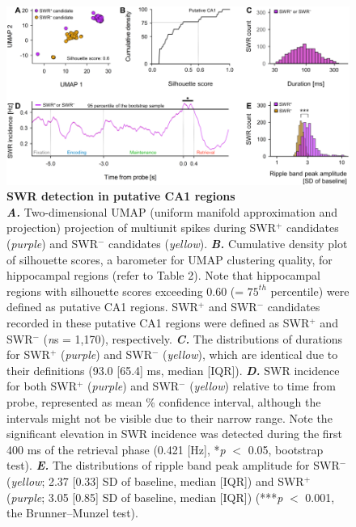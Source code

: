 \documentclass[final,3p,times,twocolumn]{elsarticle}
\begin{document}
        \begin{figure}[ht]
        	\centering
            \includegraphics[width=1\textwidth]{./src/figures/.png/Figure_ID_04.png}
        	\caption{\textbf{
SWR detection in putative CA1 regions
}
\smallskip
\\
\textbf{\textit{A.}} Two-dimensional UMAP (uniform manifold approximation and projection)\cite{mcinnes_umap_2018} projection of multiunit spikes during SWR$^+$ candidates (\textit{purple}) and SWR$^-$ candidates (\textit{yellow}). \textbf{\textit{B.}}  Cumulative density plot of silhouette scores, a barometer for UMAP clustering quality, for hippocampal regions (refer to Table 2). Note that hippocampal regions with silhouette scores exceeding 0.60 (= $75^{th}$ percentile) were defined as putative CA1 regions. SWR$^+$ and SWR$^-$ candidates recorded in these putative CA1 regions were defined as SWR$^+$ and SWR$^-$ (\textit{n}s = 1,170), respectively. \textbf{\textit{C.}}  The distributions of durations for SWR$^+$ (\textit{purple}) and SWR$^-$ (\textit{yellow}), which are identical due to their definitions (93.0 [65.4] ms, median [IQR]). \textbf{\textit{D.}}  SWR incidence for both SWR$^+$ (\textit{purple}) and SWR$^-$ (\textit{yellow}) relative to time from probe, represented as mean \% confidence interval, although the intervals might not be visible due to their narrow range. Note the significant elevation in SWR incidence was detected during the first 400 ms of the retrieval phase (0.421 [Hz], *\textit{p} $<$ 0.05, bootstrap test). \textbf{\textit{E.}}  The distributions of ripple band peak amplitude for SWR$^-$ (\textit{yellow}; 2.37 [0.33] SD of baseline, median [IQR]) and SWR$^+$ (\textit{purple}; 3.05 [0.85] SD of baseline, median [IQR]) (***\textit{p} $<$ 0.001, the Brunner--Munzel test).
}
        	\label{fig:04}
        \end{figure}
\end{document}
